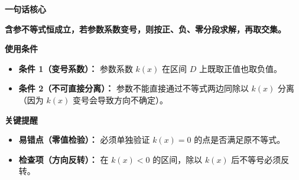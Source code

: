 \begin{summarybox}

	\textbf{\textcolor{CSummary}{一句话核心}}

	\textbf{含参不等式恒成立，若参数系数变号，则按正、负、零分段求解，再取交集。}

	\medskip
	\textbf{\textcolor{CSummary}{使用条件}}
	\begin{itemize}[leftmargin=*, itemsep=0.5em, topsep=0.4em]
		\item \textbf{条件 1（变号系数）：} 参数系数 $k(x)$ 在区间 $D$ 上既取正值也取负值。
		\item \textbf{条件 2（不可直接分离）：} 参数不能直接通过不等式两边同除以 $k(x)$ 分离（因为 $k(x)$ 变号会导致方向不确定）。
	\end{itemize}

	\medskip
	\textbf{\textcolor{CSummary}{关键提醒}}
	\begin{itemize}[leftmargin=*, itemsep=0.5em, topsep=0.4em]
		\item \textbf{易错点（零值检验）：} 必须单独验证 $k(x)=0$ 的点是否满足原不等式。
		\item \textbf{检查项（方向反转）：} 在 $k(x)<0$ 的区间，除以 $k(x)$ 后不等号必须反转。
	\end{itemize}
\end{summarybox}
